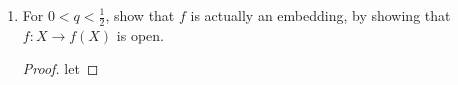 \documentclass[a4paper,11pt]{article}
\newcommand{\N}{\mathbb{N}}
\begin{document}
\begin{enumerate}[label=\textbf{(\alph*)}]
\begin{proof}
        Assume that for some $k \geq 1$, $x_n = y_n$ for all $n\leq k$.
        We want to show that $x_{k+1} = y_{k+1}$. 

        We still have that:
        \begin{align*}
            0 &= \left|\sum_{n=1}^{\infty} x_n q^n - \sum_{n=1}^{\infty} y_n q^n\right| \\
            &= \left|\sum_{n=k+1}^{\infty} x_n q^n - \sum_{n=k+1}^{\infty}y_n q^n\right| 
            &&\text{(induction hypothesis)}\\
            &= q^k \left|\sum_{n=1}^{\infty} x_{n+k} q^n - \sum_{n=1}^{\infty} y_{n+k} q^n\right| \\
            &\Leftrightarrow f((x_{n+k})_{n\in\N}) = f((y_{n+k})_{n\in\N}) 
            &&\text{(definition of $f$)}\\
            &\Rightarrow x_{k+1} = y_{k+1}. 
            &&\text{(base case for $k=1$)}
        \end{align*}
        By induction, $x_n = y_n$ for all $n\in \N$, and therefore $(x_n)_{n\in\N} = (y_n)_{n\in\N}$.
        Thus, $f$ is injective.
    \end{proof}

    \item For $0 < q < \frac{1}{2}$, show that $f$ is actually an embedding, by showing that $f \colon X \to f(X)$ is open.
    \begin{proof}
        let
    \end{proof}
\end{enumerate}
\end{document}
